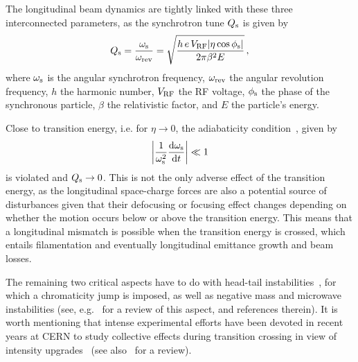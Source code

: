 \documentclass{article}
\begin{document}
The longitudinal beam dynamics are tightly linked with these three interconnected parameters, as the synchrotron tune $Q_{\rm s}$ is given by~\cite{sylee}
%
\begin{equation}
 Q_{\rm s} = \frac{\omega_{\rm s}}{\omega_{\rm rev}} = \sqrt{\frac{h \, e \, V_{\rm RF} |\eta \cos \phi_{\rm s}| }{2\pi \beta^2 E}}   \, ,
\end{equation} 
% 
where $\omega_{\rm s}$ is the angular synchrotron frequency, $\omega_{\rm rev}$ the angular revolution frequency, $h$ the harmonic number, $V_{\rm RF}$ the RF voltage, $\phi_{\rm s}$ the phase of the synchronous particle, $\beta$ the relativistic factor, and $E$ the particle's energy.

Close to transition energy, i.e. for $\eta \to 0$, the adiabaticity condition~\cite{sylee}, given by
%
\begin{equation}
    \left \vert \frac{1}{\omega_{\rm s}^2} \frac{{\rm d} \omega_{\rm s}}{{\rm d} t} \right \vert \ll 1
\end{equation}
%
is violated and $Q_{\rm s} \to 0$. This is not the only adverse effect of the transition energy, as the longitudinal space-charge forces are also a potential source of disturbances given that their defocusing or focusing effect changes depending on whether the motion occurs below or above the transition energy. This means that a longitudinal mismatch is possible when the transition energy is crossed, which entails filamentation and eventually longitudinal emittance growth and beam losses. 

The remaining two critical aspects have to do with head-tail instabilities~\cite{inst1,inst2,inst3}, for which a chromaticity jump is imposed, as well as negative mass and microwave instabilities (see, e.g.~\cite{inst4} for a review of this aspect, and references therein). It is worth mentioning that intense experimental efforts have been devoted in recent years at CERN to study collective effects during  transition crossing in view of intensity upgrades~\cite{trstudies1,trstudies2,trstudies3} (see also~\cite{yannis} for a review).
\end{document}
